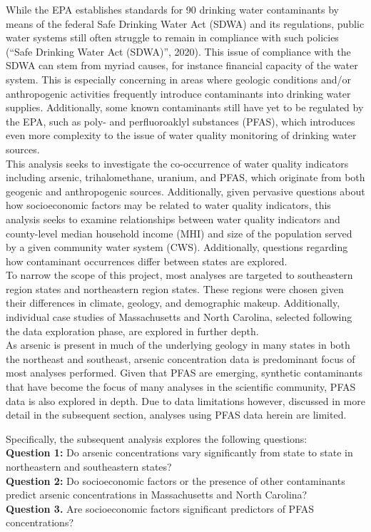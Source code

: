 \documentclass[12pt,]{article}
\begin{document}
While the EPA establishes standards for 90 drinking water contaminants
by means of the federal Safe Drinking Water Act (SDWA) and its
regulations, public water systems still often struggle to remain in
compliance with such policies (``Safe Drinking Water Act (SDWA)'',
2020). This issue of compliance with the SDWA can stem from myriad
causes, for instance financial capacity of the water system. This is
especially concerning in areas where geologic conditions and/or
anthropogenic activities frequently introduce contaminants into drinking
water supplies. Additionally, some known contaminants still have yet to
be regulated by the EPA, such as poly- and perfluoroaklyl substances
(PFAS), which introduces even more complexity to the issue of water
quality monitoring of drinking water sources.\\
This analysis seeks to investigate the co-occurrence of water quality
indicators including arsenic, trihalomethane, uranium, and PFAS, which
originate from both geogenic and anthropogenic sources. Additionally,
given pervasive questions about how socioeconomic factors may be related
to water quality indicators, this analysis seeks to examine
relationships between water quality indicators and county-level median
household income (MHI) and size of the population served by a given
community water system (CWS). Additionally, questions regarding how
contaminant occurrences differ between states are explored.\\
To narrow the scope of this project, most analyses are targeted to
southeastern region states and northeastern region states. These regions
were chosen given their differences in climate, geology, and demographic
makeup. Additionally, individual case studies of Massachusetts and North
Carolina, selected following the data exploration phase, are explored in
further depth.\\
As arsenic is present in much of the underlying geology in many states
in both the northeast and southeast, arsenic concentration data is
predominant focus of most analyses performed. Given that PFAS are
emerging, synthetic contaminants that have become the focus of many
analyses in the scientific community, PFAS data is also explored in
depth. Due to data limitations however, discussed in more detail in the
subsequent section, analyses using PFAS data herein are limited.

Specifically, the subsequent analysis explores the following
questions:\\
\textbf{Question 1:} Do arsenic concentrations vary significantly from
state to state in northeastern and southeastern states?\\
\textbf{Question 2:} Do socioeconomic factors or the presence of other
contaminants predict arsenic concentrations in Massachusetts and North
Carolina?\\
\textbf{Question 3.} Are socioeconomic factors significant predictors of
PFAS concentrations?
\end{document}
